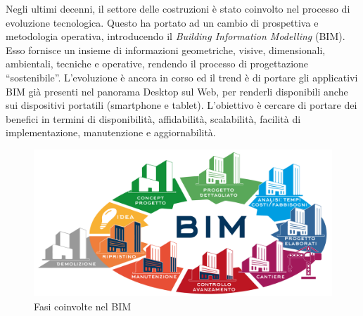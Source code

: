 Negli ultimi decenni, il settore delle costruzioni è stato coinvolto nel processo di evoluzione tecnologica.
Questo ha portato ad un cambio di prospettiva e metodologia operativa, introducendo il \emph{Building Information Modelling} (BIM).
Esso fornisce un insieme di informazioni geometriche, visive, dimensionali, ambientali, tecniche e operative, rendendo
il processo di progettazione ``sostenibile''.
L'evoluzione è ancora in corso ed il trend è di portare gli applicativi BIM già presenti nel panorama Desktop sul Web, per renderli disponibili anche
sui dispositivi portatili (smartphone e tablet). L'obiettivo è cercare di portare dei benefici in termini di disponibilità, affidabilità,
scalabilità, facilità di implementazione, manutenzione e aggiornabilità.

\begin{figure}[htbp] %
   \centering
   \includegraphics[width=1\linewidth]{images/bim}
   \caption{Fasi coinvolte nel BIM}
   \label{fig:bim}
\end{figure}
\newpage
